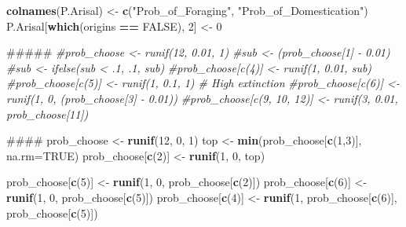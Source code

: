 \documentclass[]{book}
\newenvironment{Shaded}{\begin{snugshade}}{\end{snugshade}}
\newcommand{\KeywordTok}[1]{\textcolor[rgb]{0.13,0.29,0.53}{\textbf{{#1}}}}
\newcommand{\DataTypeTok}[1]{\textcolor[rgb]{0.13,0.29,0.53}{{#1}}}
\newcommand{\DecValTok}[1]{\textcolor[rgb]{0.00,0.00,0.81}{{#1}}}
\newcommand{\StringTok}[1]{\textcolor[rgb]{0.31,0.60,0.02}{{#1}}}
\newcommand{\CommentTok}[1]{\textcolor[rgb]{0.56,0.35,0.01}{\textit{{#1}}}}
\newcommand{\OtherTok}[1]{\textcolor[rgb]{0.56,0.35,0.01}{{#1}}}
\newcommand{\OperatorTok}[1]{\textcolor[rgb]{0.81,0.36,0.00}{\textbf{{#1}}}}
\newcommand{\NormalTok}[1]{{#1}}
\theoremstyle{definition}
\theoremstyle{definition}
\theoremstyle{definition}
\theoremstyle{remark}
\begin{document}
\begin{Shaded}
\begin{Highlighting}[]
    \KeywordTok{colnames}\NormalTok{(P.Arisal) <-}\StringTok{ }\KeywordTok{c}\NormalTok{(}\StringTok{"Prob_of_Foraging"}\NormalTok{, }\StringTok{"Prob_of_Domestication"}\NormalTok{)}
\NormalTok{    P.Arisal[}\KeywordTok{which}\NormalTok{(origins }\OperatorTok{==}\StringTok{ }\OtherTok{FALSE}\NormalTok{), }\DecValTok{2}\NormalTok{]  <-}\StringTok{ }\DecValTok{0}
    
\NormalTok{    #####}
    \CommentTok{#prob_choose <- runif(12, 0.01, 1)}
    \CommentTok{#sub <- (prob_choose[1] - 0.01)}
    \CommentTok{#sub <- ifelse(sub < .1, .1, sub)}
    \CommentTok{#prob_choose[c(4)] <- runif(1, 0.01, sub)}
    \CommentTok{#prob_choose[c(5)] <- runif(1, 0.1, 1) # High extinction}
    \CommentTok{#prob_choose[c(6)] <- runif(1, 0, (prob_choose[3] - 0.01))}
    \CommentTok{#prob_choose[c(9, 10, 12)] <- runif(3, 0.01, prob_choose[11])}
    
\NormalTok{    ####}
\NormalTok{    prob_choose <-}\StringTok{ }\KeywordTok{runif}\NormalTok{(}\DecValTok{12}\NormalTok{, }\DecValTok{0}\NormalTok{, }\DecValTok{1}\NormalTok{)}
\NormalTok{    top <-}\StringTok{ }\KeywordTok{min}\NormalTok{(prob_choose[}\KeywordTok{c}\NormalTok{(}\DecValTok{1}\NormalTok{,}\DecValTok{3}\NormalTok{)], }\DataTypeTok{na.rm=}\OtherTok{TRUE}\NormalTok{)}
\NormalTok{    prob_choose[}\KeywordTok{c}\NormalTok{(}\DecValTok{2}\NormalTok{)] <-}\StringTok{ }\KeywordTok{runif}\NormalTok{(}\DecValTok{1}\NormalTok{, }\DecValTok{0}\NormalTok{, top)}
    
\NormalTok{    prob_choose[}\KeywordTok{c}\NormalTok{(}\DecValTok{5}\NormalTok{)] <-}\StringTok{ }\KeywordTok{runif}\NormalTok{(}\DecValTok{1}\NormalTok{, }\DecValTok{0}\NormalTok{, prob_choose[}\KeywordTok{c}\NormalTok{(}\DecValTok{2}\NormalTok{)]) }
\NormalTok{    prob_choose[}\KeywordTok{c}\NormalTok{(}\DecValTok{6}\NormalTok{)] <-}\StringTok{ }\KeywordTok{runif}\NormalTok{(}\DecValTok{1}\NormalTok{, }\DecValTok{0}\NormalTok{, prob_choose[}\KeywordTok{c}\NormalTok{(}\DecValTok{5}\NormalTok{)])}
\NormalTok{    prob_choose[}\KeywordTok{c}\NormalTok{(}\DecValTok{4}\NormalTok{)] <-}\StringTok{ }\KeywordTok{runif}\NormalTok{(}\DecValTok{1}\NormalTok{, prob_choose[}\KeywordTok{c}\NormalTok{(}\DecValTok{6}\NormalTok{)], prob_choose[}\KeywordTok{c}\NormalTok{(}\DecValTok{5}\NormalTok{)])}
    

\end{Highlighting}
\end{Shaded}
\end{document}
